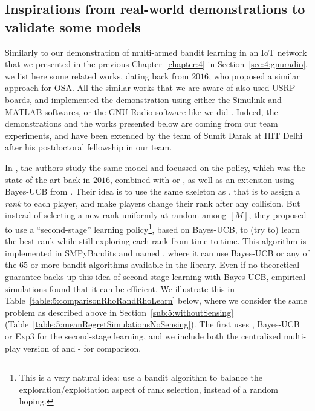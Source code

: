 \subsection{Inspirations from real-world demonstrations to validate some models}
\label{sub:5:USRPdemos}

Similarly to our demonstration of multi-armed bandit learning in an IoT network that we presented in the previous Chapter~\ref{chapter:4} in Section~\ref{sec:4:gnuradio},
we list here some related works, dating back from $2016$, who proposed a similar approach for OSA.
All the similar works that we are aware of also used USRP boards, and implemented the demonstration using either the Simulink and MATLAB softwares, or the GNU Radio software like we did \cite{Besson2018ICT}.
%
Indeed, the demonstrations and the works presented below are coming from our team experiments, and have been extended by the team of Sumit Darak at IIIT Delhi after his postdoctoral fellowship in our team.

In \cite{darak2016bayesian,Darak16}, the authors study the same model and focussed on the \RhoRand{} policy, which was the state-of-the-art back in $2016$, combined with \UCB{} or \klUCB, as well as an extension using Bayes-UCB from \cite{Kaufmann12BUCB}.
Their idea is to use the same skeleton as \RhoRand, that is to assign a \emph{rank} to each player, and make players change their rank after any collision. But instead of selecting a new rank uniformly at random among $[M]$, they proposed to use a ``second-stage'' learning policy\footnote{This is a very natural idea: use a bandit algorithm to balance the exploration/exploitation aspect of rank selection, instead of a random hoping.}, based on Bayes-UCB, to (try to) learn the best rank while still exploring each rank from time to time.
This algorithm is implemented in SMPyBandits and named \rhoLearn,
where it can use Bayes-UCB or any of the $65$ or more bandit algorithms available in the library.
Even if no theoretical guarantee backs up this idea of second-stage learning with Bayes-UCB, empirical simulations found that it can be efficient.
We illustrate this in Table~\ref{table:5:comparisonRhoRandRhoLearn} below, where we consider the same problem as described above in Section~\ref{sub:5:withoutSensing} (Table~\ref{table:5:meanRegretSimulationsNoSensing}).
The first \rhoLearn uses \klUCB{}, Bayes-UCB or Exp3 for the second-stage learning,
and we include both the centralized multi-play version of \klUCB{} and \MCTopM-\klUCB{} for comparison.

